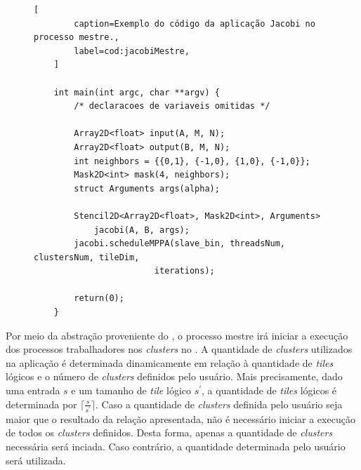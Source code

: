 \newlength\someheight
\setlength\someheight{3cm}

\begin{figure}[t]
	\begin{lstlisting}[
		caption=Exemplo do código da aplicação Jacobi no processo mestre.,
		label=cod:jacobiMestre,
	]

	int main(int argc, char **argv) {
		/* declaracoes de variaveis omitidas */

		Array2D<float> input(A, M, N);
		Array2D<float> output(B, M, N);
		int neighbors = {{0,1}, {-1,0}, {1,0}, {-1,0}};
		Mask2D<int> mask(4, neighbors);
		struct Arguments args(alpha);

		Stencil2D<Array2D<float>, Mask2D<int>, Arguments>
			jacobi(A, B, args);
		jacobi.scheduleMPPA(slave_bin, threadsNum, clustersNum, tileDim,
                        iterations);

		return(0);
	}
\end{lstlisting}
\end{figure}

Por meio da abstração proveniente do \pskel, o processo mestre irá iniciar a
execução dos processos trabalhadores nos \textit{clusters} no \mppa. A
quantidade de \textit{clusters} utilizados na aplicação é determinada
dinamicamente em relação à quantidade de \textit{tiles} lógicos e o número de
\textit{clusters} definidos pelo usuário.  Mais precisamente, dado uma entrada
$s$ e um tamanho de \textit{tile} lógico $s^\prime$, a quantidade de
\textit{tiles} lógicos é determinada por $\lceil\frac{s}{s^\prime}\rceil$. Caso
a quantidade de \textit{clusters} definida pelo usuário seja maior que o
resultado da relação apresentada, não é necessário iniciar a execução de todos
os \textit{clusters} definidos. Desta forma, apenas a quantidade de
\textit{clusters} necessária será inciada. Caso contrário, a quantidade
determinada pelo usuário será utilizada.

